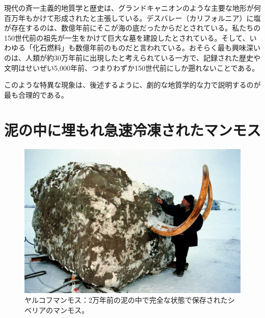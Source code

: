 \documentclass[10pt,twocolumn,letterpaper]{article}
\begin{document}
現代の斉一主義的地質学と歴史は、グランドキャニオンのような主要な地形が何百万年もかけて形成されたと主張している\cite{143}。デスバレー（カリフォルニア）に塩が存在するのは、数億年前にそこが海の底だったからだとされている\cite{144}。私たちの150世代前の祖先が一生をかけて巨大な墓を建設したとされている\cite{29,70}。そして、いわゆる「化石燃料」も数億年前のものだと言われている\cite{104}。おそらく最も興味深いのは、人類が約30万年前に出現したと考えられている一方で、記録された歴史や文明はせいぜい5,000年前、つまりわずか150世代前にしか遡れないことである\cite{145}。

このような特異な現象は、後述するように、劇的な地質学的な力で説明するのが最も合理的である。

\section{泥の中に埋もれ急速冷凍されたマンモス}

\begin{figure}[t]
\begin{center}
   \includegraphics[width=1\linewidth]{jarkov-mammoth.jpg}
\end{center}
   \caption{ヤルコフマンモス：2万年前の泥の中で完全な状態で保存されたシベリアのマンモス\cite{51}。}
\label{fig:1}
\label{fig:onecol}
\end{figure}
\end{document}
